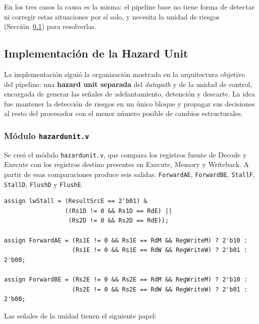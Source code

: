 \documentclass[11pt,a4paper]{article}
\begin{document}
En los tres casos la causa es la misma: el pipeline base no tiene forma de
detectar ni corregir estas situaciones por sí solo, y necesita la unidad de
riesgos (Sección~\ref{sec:hazard-unit-impl}) para resolverlas.

\subsection{Implementación de la Hazard Unit}
\label{sec:hazard-unit-impl}

La implementación siguió la organización mostrada en la arquitectura objetivo del
pipeline: una \textbf{hazard unit separada} del \textit{datapath} y de la unidad de
control, encargada de generar las señales de adelantamiento, detención y descarte. La
idea fue mantener la detección de riesgos en un único bloque y propagar sus decisiones al
resto del procesador con el menor número posible de cambios estructurales.

\subsubsection{Módulo \texttt{hazardunit.v}}

Se creó el módulo \texttt{hazardunit.v}, que compara los registros fuente de Decode y
Execute con los registros destino presentes en Execute, Memory y Writeback. A partir de
esas comparaciones produce seis salidas: \texttt{ForwardAE}, \texttt{ForwardBE},
\texttt{StallF}, \texttt{StallD}, \texttt{FlushD} y \texttt{FlushE}.

\begin{lstlisting}
assign lwStall = (ResultSrcE == 2'b01) &
                 ((Rs1D != 0 && Rs1D == RdE) ||
                  (Rs2D != 0 && Rs2D == RdE));

assign ForwardAE = (Rs1E != 0 && Rs1E == RdM && RegWriteM) ? 2'b10 :
                   (Rs1E != 0 && Rs1E == RdW && RegWriteW) ? 2'b01 : 2'b00;

assign ForwardBE = (Rs2E != 0 && Rs2E == RdM && RegWriteM) ? 2'b10 :
                   (Rs2E != 0 && Rs2E == RdW && RegWriteW) ? 2'b01 : 2'b00;
\end{lstlisting}

Las señales de la unidad tienen el siguiente papel:
\end{document}
